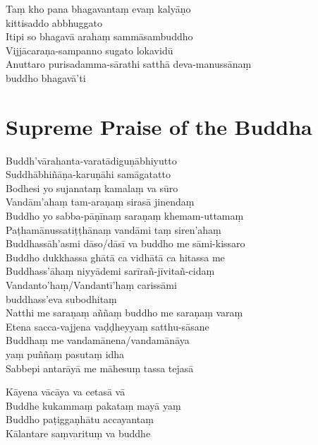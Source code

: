Taṃ kho pana bhagavantaṃ evaṃ kalyāṇo\\
\vin kittisaddo abbhuggato\\
Itipi so bhagavā arahaṃ sammāsambuddho\\
Vijjācaraṇa-sampanno sugato lokavidū\\
Anuttaro purisadamma-sārathi satthā deva-manussānaṃ\\
\vin buddho bhagavā'ti

\section*{Supreme Praise of the Buddha}

\begin{leader}
\end{leader}

Buddh'vārahanta-varatādiguṇābhiyutto\\
Suddhābhiñāṇa-karuṇāhi samāgatatto\\
Bodhesi yo sujanataṃ kamalaṃ va sūro\\
Vandām'ahaṃ tam-araṇaṃ sirasā jinendaṃ\\
Buddho yo sabba-pāṇīnaṃ saraṇaṃ khemam-uttamaṃ\\
Paṭhamānussatiṭṭhānaṃ vandāmi taṃ siren'ahaṃ\\
Buddhassāh'asmi dāso/dāsī va buddho me sāmi-kissaro\\
Buddho dukkhassa ghātā ca vidhātā ca hitassa me\\
Buddhass'āhaṃ niyyādemi sarīrañ-jīvitañ-cidaṃ\\
Vandanto'haṃ/Vandantī'haṃ carissāmi\\
\vin buddhass'eva subodhitaṃ\\
Natthi me saraṇaṃ aññaṃ buddho me saraṇaṃ varaṃ\\
Etena sacca-vajjena vaḍḍheyyaṃ satthu-sāsane\\
Buddhaṃ me vandamānena/vandamānāya\\
\vin yaṃ puññaṃ pasutaṃ idha\\
Sabbepi antarāyā me māhesuṃ tassa tejasā

\enlargethispage{\baselineskip}


Kāyena vācāya va cetasā vā\\
Buddhe kukammaṃ pakataṃ mayā yaṃ\\
Buddho paṭiggaṇhātu accayantaṃ\\
Kālantare saṃvarituṃ va buddhe


